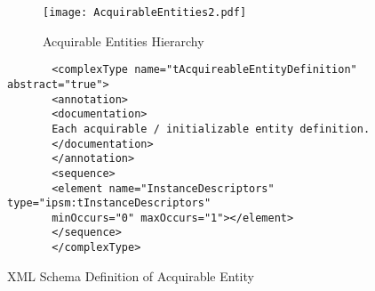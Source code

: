 \begin{figure}
	\centering
	\texttt{[image: AcquirableEntities2.pdf]}
	\caption{Acquirable Entities Hierarchy}
	\label{fig:acquirableentities2}
\end{figure}

\begin{Listing}
	\begin{lstlisting}
	   <complexType name="tAcquireableEntityDefinition" abstract="true">
	   <annotation>
	   <documentation>
	   Each acquirable / initializable entity definition.
	   </documentation>
	   </annotation>
	   <sequence>
	   <element name="InstanceDescriptors" type="ipsm:tInstanceDescriptors"
	   minOccurs="0" maxOccurs="1"></element>
	   </sequence>
	   </complexType>
		\end{lstlisting}
		\caption{XML Schema Definition of Acquirable Entity}
		\label{lst:xsdacquirable}
\end{Listing}

